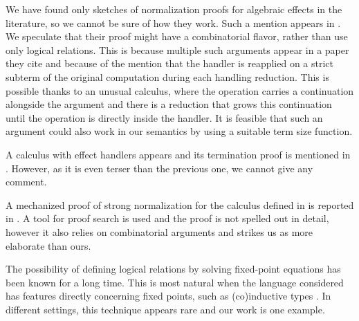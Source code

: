 \documentclass[a4paper, 12pt]{report}
\newcommand{\+}{\enspace}
\begin{document}
We have found only sketches of normalization proofs for algebraic effects in the literature,
so we cannot be sure of how they work.
Such a mention appears in \cite{hia}.
We speculate that their proof might have
a combinatorial flavor, rather than use only logical relations.
This is because multiple such arguments appear in a paper they cite \cite{exrw} and
because of the mention that the handler is reapplied
on a strict subterm of the original computation during each handling reduction.
This is possible thanks to an unusual calculus,
where the operation carries a continuation alongside the argument
and there is a reduction that grows this continuation until
the operation is directly inside the handler.
It is feasible that such an argument could also work in our semantics by using
a suitable term size function.

A calculus with effect handlers appears and its termination proof is mentioned in \cite{expressive}.
However, as it is even terser than the previous one, we cannot give any comment.

A mechanized proof of strong normalization for the calculus defined in \cite{expressive}
is reported in \cite{sol}.
A tool for proof search is used and the proof is not spelled out in detail,
however it also relies on combinatorial arguments and strikes us as more elaborate than ours.

The possibility of defining logical relations by solving fixed-point equations
has been known for a long time.
This is most natural when the language considered has features directly
concerning fixed points, such as (co)inductive types \cite{altenkirch, operfl}.
In different settings, this technique appears rare and our work is one example.



\printbibliography
\end{document}
